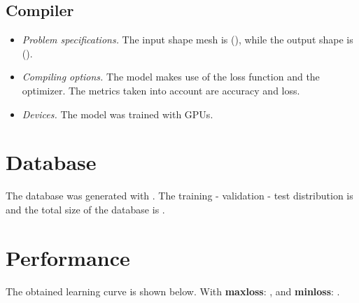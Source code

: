 \documentclass[a4paper, 11pt, margin=1in]{journal}
\begin{document}
\vspace{1cm}

\newpage
\subsection{Compiler}

\begin{itemize}
    \item \textit{Problem specifications.} The input shape mesh is (\textit{\modeli}), while the output shape is (\textit{\modelo}).
    \item \textit{Compiling options.} The model makes use of the \textit{\modelloss} loss function and the \textit{\modelopt} optimizer. The metrics taken into account are accuracy and loss.
    \item \textit{Devices.} The model was trained with \modeldevs GPUs.
\end{itemize}
\section{Database}

The database \textbf{\dbname} was generated with \textit{\dbtype}. The training - validation - test distribution is \textit{\dbdist} and the total size of the database is \textit{\dbsize}. 

\section{Performance}

The obtained learning curve is shown below. With \textbf{maxloss}: \maxloss, and \textbf{minloss}: \minloss.\\
\end{document}
